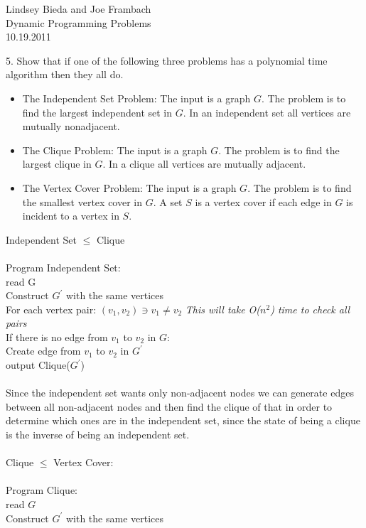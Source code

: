 \documentclass[10pt]{article}
\newcommand{\tab}{\hspace*{2em}}
\newcommand{\tabb}{\hspace*{4em}}
\newcommand{\tabbb}{\hspace*{6em}}
\begin{document}
	\begin{flushright}
	Lindsey Bieda and Joe Frambach\\
	Dynamic Programming Problems\\
	10.19.2011
	\end{flushright}
	5. Show that if one of the following three problems has a polynomial time algorithm then they all do.
	\begin{itemize}
		\item 	The Independent Set Problem: The input is a graph $G$. The problem is to find the largest
				independent set in $G$. In an independent set all vertices are mutually nonadjacent.
		\item 	The Clique Problem: The input is a graph $G$. The problem is to find the largest clique in $G$. In
				a clique all vertices are mutually adjacent.
		\item	The Vertex Cover Problem: The input is a graph $G$. The problem is to find the smallest vertex
				cover in $G$. A set $S$ is a vertex cover if each edge in $G$ is incident to a vertex in $S$.
	\end{itemize}
	Independent Set $\leq$ Clique\\
	\\
	Program Independent Set:\\
	\tab read G\\
	\tab Construct $G^\prime$ with the same vertices\\
	\tab For each vertex pair: $(v_1, v_2) \ni v_1 \neq v_2$ \emph{This will take O($n^2$) time to check all pairs}\\
	\tabb If there is no edge from $v_1$ to $v_2$ in $G$:\\
	\tabbb Create edge from $v_1$ to $v_2$ in $G^\prime$\\
	\tab output Clique($G^\prime$)\\
	\\
	Since the independent set wants only non-adjacent nodes we can generate edges between all non-adjacent nodes and then
	find the clique of that in order to determine which ones are in the independent set, since the state of being a clique
	is the inverse of being an independent set. \\
	\\
	Clique $\leq$ Vertex Cover:\\
	\\
	Program Clique:\\
	\tab read $G$\\
	\tab Construct $G^\prime$ with the same vertices\\
\end{document}
